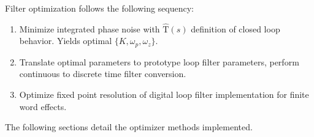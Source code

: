 Filter optimization follows the following sequency:
\begin{enumerate}[itemsep=0pt,label=\protect\mycirc{\arabic*}]
	\setlength\itemsep{-0.8em}
	\item Minimize integrated phase noise with $\mathrm{\hat{T}}(s)$ definition of closed loop behavior. Yields optimal $\{K, \omega_p, \omega_z\}$.
	\item Translate optimal parameters to prototype loop filter parameters, perform continuous to discrete time filter conversion.
	\item Optimize fixed point resolution of digital loop filter implementation for finite word effects.
\end{enumerate}

The following sections detail the optimizer methods implemented.

